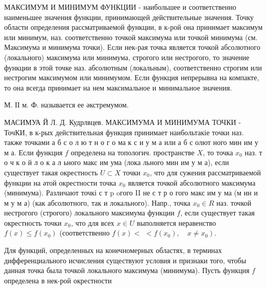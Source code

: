 \documentclass[10pt]{article}
\begin{document}
МАКСИМУМ И МИНИМУМ ФУНКЦИИ - наибольшее и соответственно наименьшее значения функции, принимающей действительные значения. Точку области определения рассматриваемой функции, в к-рой она принимает максимум или минимум, наз. соответственно точкой максимума или точкой минимума (см. Максимума и минимума точки). Если нек-рая точка является точкой абсолютного (локального) максимума или минимума, строгого или нестрогого, то значение функции в этой точке наз. абсолютным (локальным), соответственно строгим или нестрогим максимумом или минимумом. Если функция непрерывна на компакте, то она всегда принимает на нем максимальное и минимальное значения.



М. ІІ м. Ф. называется ее әкстремумом.



МАСИМУА Й Л. Д. Кудрлвцев. МАКСИМУМА И МИНИМУМА ТОЧКИ - ТочКИ, в к-рых действительная функция принимает наибольтакіе точки наз. также точками а б с о л ю т н о г о ма к с и у м а или а б с олют ного мин им у м а. Если функция $f$ определена на топологич. пространстве $X$, то точка $x_{0}$ наз. т о ч к о й л о к а л ьного макс им ума (лока льного мин им у м а), если существует такая окрестность $U \subset X$ точки $x_{0}$, что для сужения рассматриваемой функции на әтой окрестности точка $x_{0}$ является точкой абсолютного максимума (минимума). Различают точкі с т p oгого II не с т р о гого макс им у ма (м ин и м у м а) (как абсолютного, так и локального). Напр., точка $x_{0} \in R$ наз. точкой нестрогого (строгого) локального максимума функции $f$, если существует такая окрестность точки $x_{0}$, что для всех $x \in U$ выполняется неравенство $f(x) \leqslant f\left(x_{0}\right)$ (соответственно $f(x)<$ $\left.<f\left(x_{0}\right), \quad x \neq x_{0}\right)$.



Для функций, определенных на конечномерных областях, в терминах дифференциального исчисления существуют условия и признаки того, чтобы данная точка была точкой локального максимума (минимума). Пусть функция $f$ определена в нек-рой окрестности
\end{document}
